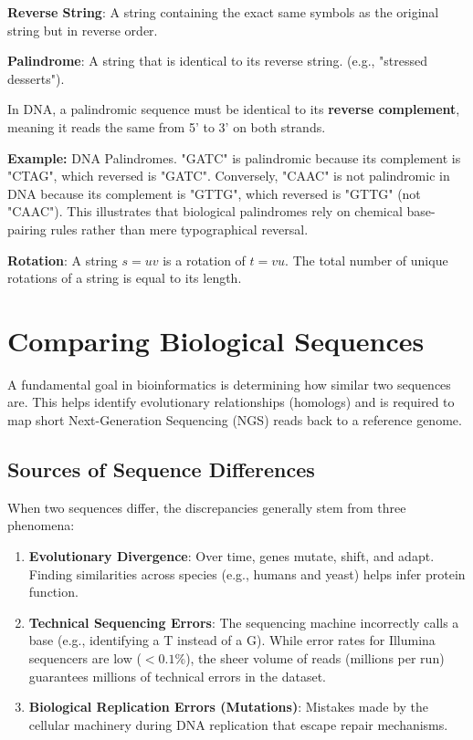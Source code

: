 \begin{important}
    \textbf{Reverse String}: A string containing the exact same symbols as the original string but in reverse order.
\end{important}

\begin{important}
    \textbf{Palindrome}: A string that is identical to its reverse string. (e.g., "stressed desserts").
\end{important}

\sta In DNA, a palindromic sequence must be identical to its \textbf{reverse complement}, meaning it reads the same from 5' to 3' on both strands.

\textbf{Example:}
DNA Palindromes. "GATC" is palindromic because its complement is "CTAG", which reversed is "GATC". Conversely, "CAAC" is not palindromic in DNA because its complement is "GTTG", which reversed is "GTTG" (not "CAAC").
This illustrates that biological palindromes rely on chemical base-pairing rules rather than mere typographical reversal.

\begin{important}
    \textbf{Rotation}: A string $s = uv$ is a rotation of $t = vu$. The total number of unique rotations of a string is equal to its length.
\end{important}

\section{Comparing Biological Sequences}

A fundamental goal in bioinformatics is determining how similar two sequences are. This helps identify evolutionary relationships (homologs) and is required to map short Next-Generation Sequencing (NGS) reads back to a reference genome.

\subsection{Sources of Sequence Differences}
When two sequences differ, the discrepancies generally stem from three phenomena:
\begin{enumerate}
    \item \textbf{Evolutionary Divergence}: Over time, genes mutate, shift, and adapt. Finding similarities across species (e.g., humans and yeast) helps infer protein function.
    \item \textbf{Technical Sequencing Errors}: The sequencing machine incorrectly calls a base (e.g., identifying a T instead of a G). While error rates for Illumina sequencers are low ($<0.1\%$), the sheer volume of reads (millions per run) guarantees millions of technical errors in the dataset.
    \item \textbf{Biological Replication Errors (Mutations)}: Mistakes made by the cellular machinery during DNA replication that escape repair mechanisms.
\end{enumerate}

